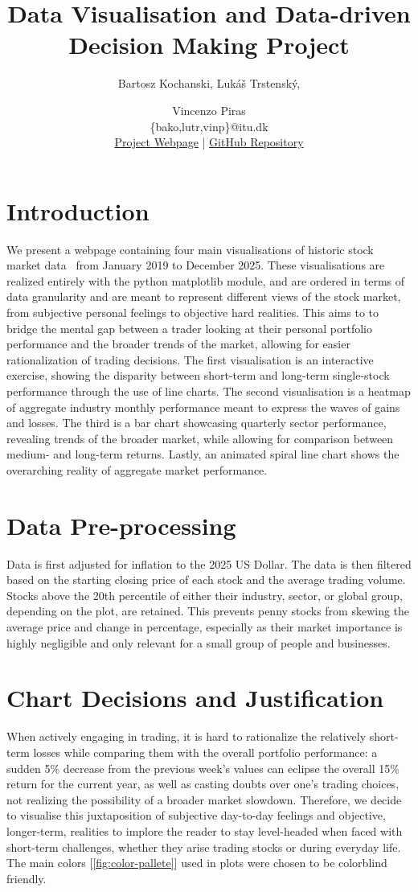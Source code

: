 \documentclass[10pt]{article}
\title{Data Visualisation and Data-driven Decision Making Project}
\author{Bartosz Kochanski, Lukáš Trstenský, \and Vincenzo Piras \\
        \{bako,lutr,vinp\}@itu.dk \\
        {\footnotesize \href{https://zoomingout-blv.streamlit.app/}{\color{lightblue}Project Webpage} | \href{https://github.com/vinp505/DataViz}{\color{lightblue}GitHub Repository}}}
\begin{document}
\maketitle
\section{Introduction}
\label{sec:intro}
We present a webpage containing four main visualisations of historic stock market data~\cite{defeatbeta_yahoo_finance_data} from January 2019 to December 2025. These visualisations are realized entirely with the python matplotlib module, and are ordered in terms of data granularity and are meant to represent different views of the stock market, from subjective personal feelings to objective hard realities. This aims to to bridge the mental gap between a trader looking at their personal portfolio performance and the broader trends of the market, allowing for easier rationalization of trading decisions. The first visualisation is an interactive exercise, showing the disparity between short-term and long-term single-stock performance through the use of line charts. The second visualisation is a heatmap of aggregate industry monthly performance meant to express the waves of gains and losses. The third is a bar chart showcasing quarterly sector performance, revealing trends of the broader market, while allowing for comparison between medium- and long-term returns. Lastly, an animated spiral line chart shows the overarching reality of aggregate market performance.

\section{Data Pre-processing}
Data is first adjusted for inflation to the 2025 US Dollar. The data is then filtered based on the starting closing price of each stock and the average trading volume. Stocks above the 20th percentile of either their industry, sector, or global group, depending on the plot, are retained. This prevents penny stocks from skewing the average price and change in percentage, especially as their market importance is highly negligible and only relevant for a small group of people and businesses.

\section{Chart Decisions and Justification}
When actively engaging in trading, it is hard to rationalize the relatively short-term losses while comparing them with the overall portfolio performance: a sudden 5\% decrease from the previous week's values can eclipse the overall 15\% return for the current year, as well as casting doubts over one's trading choices, not realizing the possibility of a broader market slowdown. Therefore, we decide to visualise this juxtaposition of subjective day-to-day feelings and objective, longer-term, realities to implore the reader to stay level-headed when faced with short-term challenges, whether they arise trading stocks or during everyday life. The main colors [\autoref{fig:color-pallete}] used in plots were chosen to be colorblind friendly.
\end{document}

